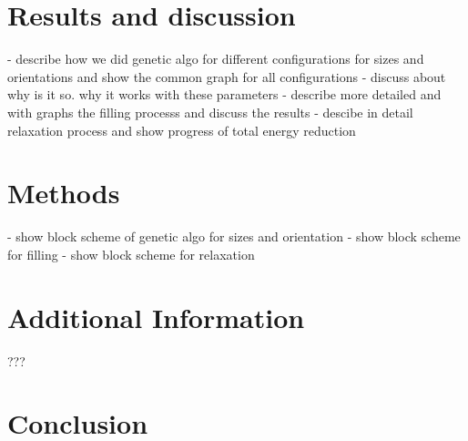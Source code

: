 \documentclass{article}
\begin{document}
\section{Results and discussion}

- describe how we did genetic algo for different configurations for sizes and orientations and show the common graph for all configurations
- discuss about why is it so. why it works with these parameters
- describe more detailed and with graphs the filling processs and discuss the results
- descibe in detail relaxation process and show progress of total energy reduction

\section{Methods}

- show block scheme of genetic algo for sizes and orientation
- show block scheme for filling
- show block scheme for relaxation
 
\section{Additional Information}

???

\section{Conclusion}
\end{document}
